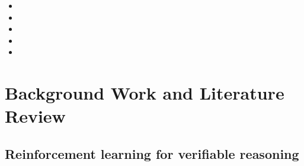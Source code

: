 \documentclass[12pt,a4paper,oneside]{report}
\newif\ifdraft
\newcommand{\writehere}[2]{%
  \ifdraft
    \begin{tcolorbox}[colback=yellow!8,colframe=orange!55,
                      boxrule=0.6pt,left=6pt,right=6pt,top=4pt,bottom=4pt]
    {\small\textbf{WRITE: #1}\\[2pt]#2}
    \end{tcolorbox}
  \fi}
\begin{document}
\begin{itemize}

\item \writehere{Contribution 1, the diagnosis}{
Correct count equals finished count per problem. 95 of 120 samples finished and
essentially all were correct; of the 25 truncated, 23 scored zero for lack of a
parseable answer. State that the whole 91.4 to 80.8 shortfall is a truncation
artifact, and that to your knowledge this decomposition has not been reported for
a model in this size class.}

\item \writehere{Contribution 2, the intervention measured}{
Budget forcing \cite{s1} evaluated on a compact model at four budgets. Significant
at every budget by McNemar's test, and strictly non destructive: zero correct
answers destroyed across 139 interventions.}

\item \writehere{Contribution 3, a negative result}{
Three forcing phrasings are statistically indistinguishable, and the two stage
variant costs 2.1 times more compute for no gain. What matters is that the model
is made to commit, not how it is asked.}

\item \writehere{Contribution 4, upper bounds}{
A single forced sample beats the best of four unforced samples at the smaller
budgets, so forcing exceeds the ceiling of any method that only selects among
existing answers. Restricted to the recoverable population, forcing captures about
80 percent of what is there.}

\item \writehere{Contribution 5, the method that made it affordable}{
Prefix consistency. Generation is autoregressive, so the first N tokens of a long
run are what a budget N run would have produced. Generate once at the top budget,
save the traces, score every smaller budget on CPU at zero GPU cost. You validated
this rather than assuming it, and it cut the sweep by roughly a factor of three.}

\end{itemize}

\chapter{Background Work and Literature Review}

\section{Reinforcement learning for verifiable reasoning}
\end{document}
